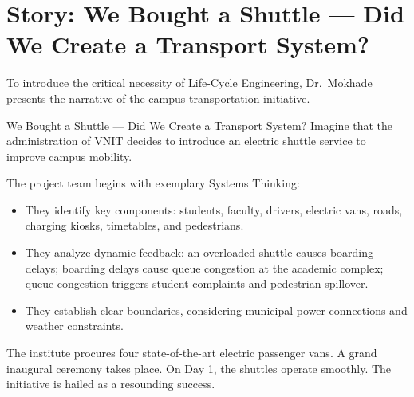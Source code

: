 \section{Story: We Bought a Shuttle --- Did We Create a Transport System?}
\label{sec:shuttle_story}

To introduce the critical necessity of Life-Cycle Engineering, Dr.~Mokhade presents the narrative of the campus transportation initiative.

\begin{storybox}{We Bought a Shuttle --- Did We Create a Transport System?}
Imagine that the administration of VNIT decides to introduce an electric shuttle service to improve campus mobility. 

The project team begins with exemplary Systems Thinking:
\begin{itemize}[leftmargin=1.5em]
    \item They identify key components: students, faculty, drivers, electric vans, roads, charging kiosks, timetables, and pedestrians.
    \item They analyze dynamic feedback: an overloaded shuttle causes boarding delays; boarding delays cause queue congestion at the academic complex; queue congestion triggers student complaints and pedestrian spillover.
    \item They establish clear boundaries, considering municipal power connections and weather constraints.
\end{itemize}
The institute procures four state-of-the-art electric passenger vans. A grand inaugural ceremony takes place. On Day 1, the shuttles operate smoothly. The initiative is hailed as a resounding success.


\end{storybox}
